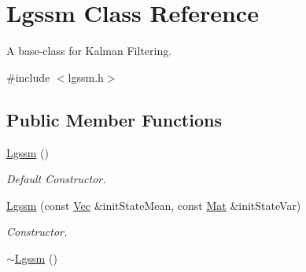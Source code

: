 \hypertarget{classLgssm}{}\section{Lgssm Class Reference}
\label{classLgssm}


A base-\/class for Kalman Filtering.  




{\ttfamily \#include $<$lgssm.\+h$>$}

\subsection*{Public Member Functions}
\begin{DoxyCompactItemize}
\item 
\hyperlink{classLgssm_a8c729ab27738f29225847777b740877e}{Lgssm} ()\hypertarget{classLgssm_a8c729ab27738f29225847777b740877e}{}\label{classLgssm_a8c729ab27738f29225847777b740877e}

\begin{DoxyCompactList}\small\item\em Default Constructor. \end{DoxyCompactList}\item 
\hyperlink{classLgssm_a779def860490023f436b4efe071789fd}{Lgssm} (const \hyperlink{pmfs_8h_a4c7df05c6f5e8a0d15ae14bcdbc07152}{Vec} \&init\+State\+Mean, const \hyperlink{pmfs_8h_ae601f56a556993079f730483c574356f}{Mat} \&init\+State\+Var)
\begin{DoxyCompactList}\small\item\em Constructor. \end{DoxyCompactList}\item 
\hyperlink{classLgssm_afdb5db740e12453879d8b985180426a4}{$\sim$\+Lgssm} ()\hypertarget{classLgssm_afdb5db740e12453879d8b985180426a4}{}\label{classLgssm_afdb5db740e12453879d8b985180426a4}


\end{DoxyCompactItemize}
